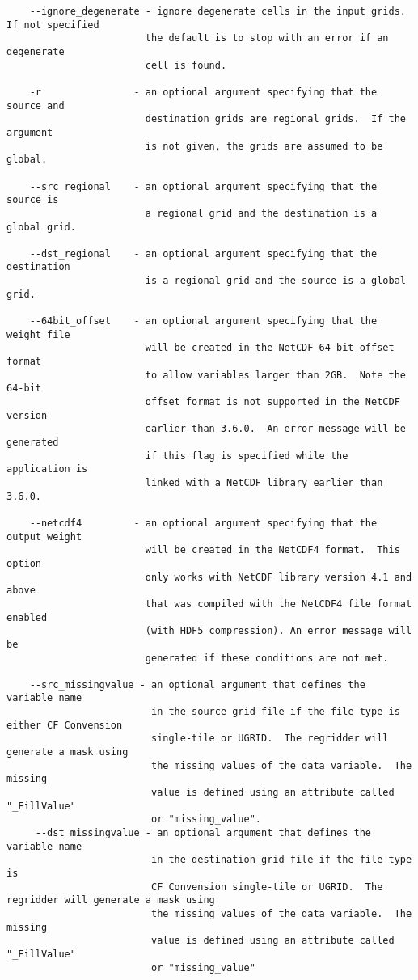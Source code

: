 \begin{verbatim}
    --ignore_degenerate - ignore degenerate cells in the input grids. If not specified
                        the default is to stop with an error if an degenerate
                        cell is found.

    -r                - an optional argument specifying that the source and
                        destination grids are regional grids.  If the argument
                        is not given, the grids are assumed to be global.

    --src_regional    - an optional argument specifying that the source is
                        a regional grid and the destination is a global grid.

    --dst_regional    - an optional argument specifying that the destination
                        is a regional grid and the source is a global grid.

    --64bit_offset    - an optional argument specifying that the weight file
                        will be created in the NetCDF 64-bit offset format
                        to allow variables larger than 2GB.  Note the 64-bit
                        offset format is not supported in the NetCDF version
                        earlier than 3.6.0.  An error message will be generated
                        if this flag is specified while the application is
                        linked with a NetCDF library earlier than 3.6.0.

    --netcdf4         - an optional argument specifying that the output weight
                        will be created in the NetCDF4 format.  This option 
                        only works with NetCDF library version 4.1 and above 
                        that was compiled with the NetCDF4 file format enabled 
                        (with HDF5 compression). An error message will be 
                        generated if these conditions are not met.

    --src_missingvalue - an optional argument that defines the variable name 
                         in the source grid file if the file type is either CF Convension
                         single-tile or UGRID.  The regridder will generate a mask using 
                         the missing values of the data variable.  The missing 
                         value is defined using an attribute called "_FillValue" 
                         or "missing_value". 
     --dst_missingvalue - an optional argument that defines the variable name
                         in the destination grid file if the file type is
                         CF Convension single-tile or UGRID.  The regridder will generate a mask using
                         the missing values of the data variable.  The missing
                         value is defined using an attribute called "_FillValue"
                         or "missing_value"


\end{verbatim}
